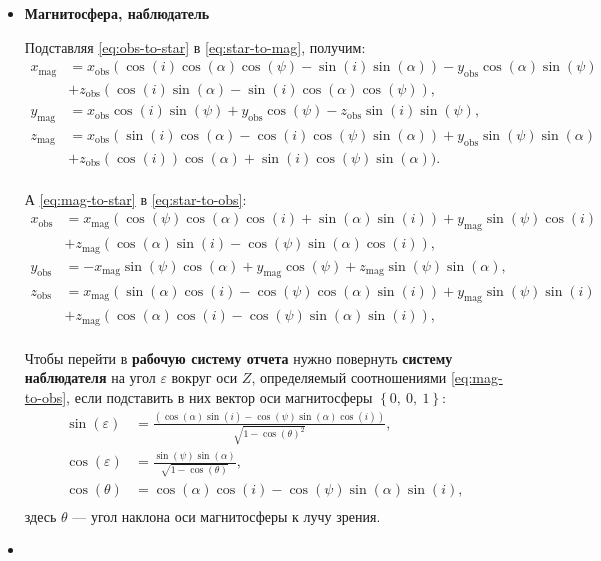 \documentclass[12pt]{article}
\begin{document}
\begin{itemize}
\item\textbf{Магнитосфера, наблюдатель}

Подставляя \eqref{eq:obs-to-star} в \eqref{eq:star-to-mag}, получим:
%
\begin{equation}\label{eq:obs-to-mag}
\begin{aligned}
x_\text{mag} &= x_\text{obs}(\cos(i)\cos(\alpha)\cos(\psi) - \sin(i)\sin(\alpha)) - y_\text{obs}\cos(\alpha)\sin(\psi) \\
             &+ z_\text{obs}(\cos(i)\sin(\alpha) - \sin(i)\cos(\alpha)\cos(\psi)), \\
y_\text{mag} &= x_\text{obs}\cos(i)\sin(\psi) + y_\text{obs}\cos(\psi) - z_\text{obs}\sin(i)\sin(\psi),  \\
z_\text{mag} &= x_\text{obs}(\sin(i)\cos(\alpha) - \cos(i)\cos(\psi)\sin(\alpha))  + y_\text{obs}\sin(\psi)\sin(\alpha) \\
             &+ z_\text{obs}(\cos(i))\cos(\alpha) + \sin(i)\cos(\psi)\sin(\alpha)). \\
\end{aligned}
\end{equation}

А \eqref{eq:mag-to-star} в \eqref{eq:star-to-obs}:
%
\begin{equation}\label{eq:mag-to-obs}
\begin{aligned}
x_\text{obs} &= x_\text{mag}(\cos(\psi)\cos(\alpha)\cos(i) + \sin(\alpha)\sin(i)) + y_\text{mag}\sin(\psi)\cos(i) \\
             &+ z_\text{mag}(\cos(\alpha)\sin(i) - \cos(\psi)\sin(\alpha)\cos(i)), \\
y_\text{obs} &= -x_\text{mag}\sin(\psi)\cos(\alpha) + y_\text{mag}\cos(\psi) + z_\text{mag}\sin(\psi)\sin(\alpha), \\
z_\text{obs} &= x_\text{mag}(\sin(\alpha)\cos(i) - \cos(\psi)\cos(\alpha)\sin(i)) + y_\text{mag}\sin(\psi)\sin(i) \\
             &+ z_\text{mag}(\cos(\alpha)\cos(i) - \cos(\psi)\sin(\alpha)\sin(i)), \\
\end{aligned}
\end{equation}

Чтобы перейти в \textbf{рабочую систему отчета} нужно повернуть \textbf{систему наблюдателя} на угол $\varepsilon$ вокруг оси $Z$, определяемый соотношениями \eqref{eq:mag-to-obs}, если подставить в них вектор оси магнитосферы $\left\lbrace 0,\ 0,\ 1 \right\rbrace$:
%
\begin{equation}\label{eq:work-orientation}
\begin{aligned}
\sin(\varepsilon) &= \frac{(\cos(\alpha)\sin(i) - \cos(\psi)\sin(\alpha)\cos(i))}{\sqrt{1-\cos(\theta)^2}}, \\
\cos(\varepsilon) &= \frac{\sin(\psi)\sin(\alpha)}{\sqrt{1-\cos(\theta)}}, \\
\cos(\theta) &= \cos(\alpha)\cos(i) - \cos(\psi)\sin(\alpha)\sin(i), \\
\end{aligned}
\end{equation}
%
здесь $\theta$ --- угол наклона оси магнитосферы к лучу зрения.

\item{}
\end{itemize}
\end{document}
